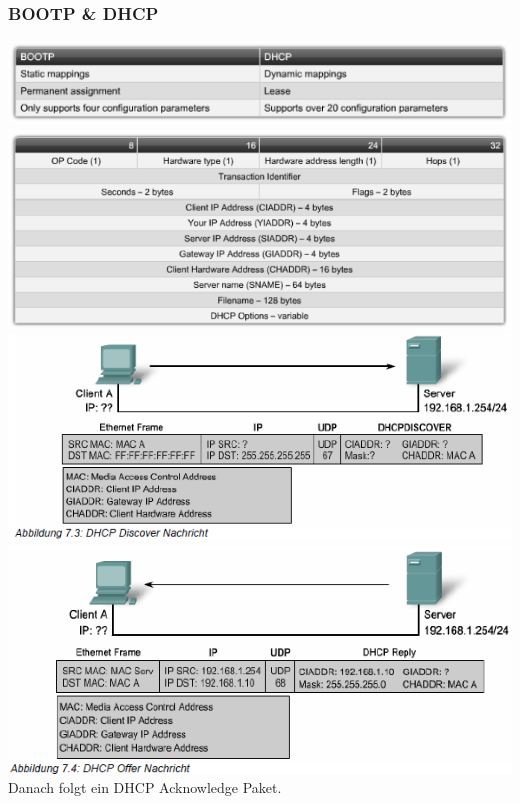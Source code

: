 \documentclass[landscape,twocolumn,a4paper]{article}
\begin{document}
\begin{footnotesize}
\subsubsection{BOOTP \& DHCP}
\includegraphics[scale=0.5]{bootp-dhcp.png}\\
\includegraphics[scale=0.5]{dhcp-message-format.png}\\
\includegraphics[scale=0.4]{dhcp-ablauf-1.png}
\includegraphics[scale=0.4]{dhcp-ablauf-2.png}\\
Danach folgt ein DHCP Acknowledge Paket.

\end{footnotesize}
\end{document}
